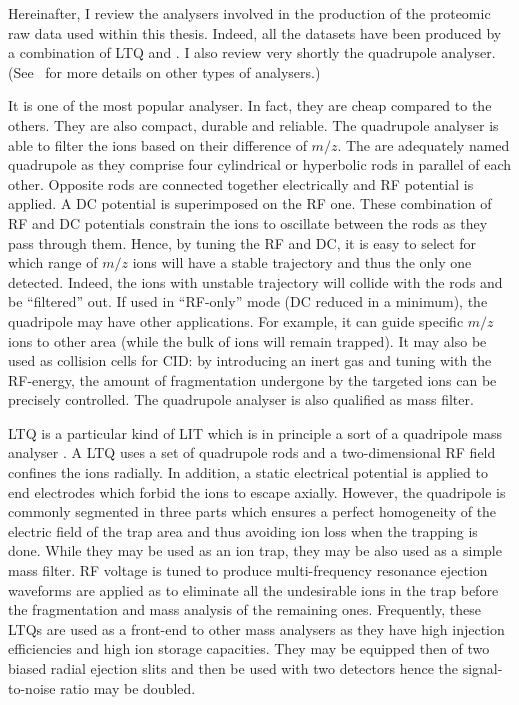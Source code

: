 Hereinafter, I review the analysers involved in the production of the
proteomic raw data used within this thesis. Indeed, all the datasets have been
produced by a combination of \acrfull{LTQ} and \orbi. I also review very
shortly the quadrupole analyser. (See~\cite{Haag2016} for more details on other
types of analysers.)


It is one of the most popular analyser. In fact, they are cheap compared to the
others. They are also compact, durable and reliable. The quadrupole analyser is
able to filter the ions based on their difference of $m/z$. The are adequately
named quadrupole as they comprise four cylindrical or hyperbolic rods in
parallel of each other. Opposite rods are connected together electrically and
\gls{RF} potential is applied. A \gls{DC} potential is superimposed on the
\gls{RF} one. These combination of \gls{RF} and \gls{DC} potentials constrain the
ions to oscillate between the rods as they pass through them. Hence, by tuning
the \gls{RF} and \gls{DC}, it is easy to select for which range of $m/z$ ions
will have a stable trajectory and thus the only one detected. Indeed, the
ions with unstable trajectory will collide with the rods and be \enquote{filtered}
out. If used in \enquote{\gls{RF}-only} mode (\gls{DC} reduced in a minimum),
the quadripole may have other applications. For example, it can guide specific
$m/z$ ions to other area (while the bulk of ions will remain trapped).
It may also be used as collision cells for \gls{CID}: by introducing an inert
gas and tuning with the \gls{RF}-energy, the amount of fragmentation undergone
by the targeted ions can be precisely controlled. 
The quadrupole analyser is also qualified as mass filter.

\gls{LTQ} is a particular kind of \acrfull{LIT} which is in principle a sort of
a quadripole mass analyser . A \gls{LTQ} uses a set of
quadrupole rods and a two-dimensional \gls{RF} field confines the ions radially.
In addition, a static electrical potential is applied to end electrodes which
forbid the ions to escape axially. However, the quadripole is commonly segmented
in three parts which ensures a perfect homogeneity of the electric field of the
trap area and thus avoiding ion loss when the trapping is done.
While they may be used as an ion trap, they
may be also used as a simple mass filter. \gls{RF} voltage is tuned to produce
multi-frequency resonance ejection waveforms are applied as to
eliminate all the undesirable ions in the trap before the fragmentation and mass
analysis of the remaining ones. Frequently, these \glspl{LTQ} are used as a
front-end to other mass analysers as they have high injection efficiencies and
high ion storage capacities. They may be equipped then of two biased radial
ejection slits and then be used with two detectors hence the signal-to-noise
ratio may be doubled.


